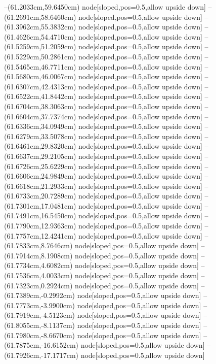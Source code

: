 --(61.2033cm,59.6450cm) node[sloped,pos=0.5,allow upside down]{\ArrowIn}
--(61.2691cm,58.6460cm) node[sloped,pos=0.5,allow upside down]{\ArrowIn}
--(61.3962cm,55.3832cm) node[sloped,pos=0.5,allow upside down]{\ArrowIn}
--(61.4626cm,54.4710cm) node[sloped,pos=0.5,allow upside down]{\arrowIn}
--(61.5259cm,51.2059cm) node[sloped,pos=0.5,allow upside down]{\ArrowIn}
--(61.5229cm,50.2861cm) node[sloped,pos=0.5,allow upside down]{\arrowIn}
--(61.5465cm,46.7711cm) node[sloped,pos=0.5,allow upside down]{\ArrowIn}
--(61.5680cm,46.0067cm) node[sloped,pos=0.5,allow upside down]{\arrowIn}
--(61.6307cm,42.4313cm) node[sloped,pos=0.5,allow upside down]{\ArrowIn}
--(61.6522cm,41.8442cm) node[sloped,pos=0.5,allow upside down]{\arrowIn}
--(61.6704cm,38.3063cm) node[sloped,pos=0.5,allow upside down]{\ArrowIn}
--(61.6604cm,37.7374cm) node[sloped,pos=0.5,allow upside down]{\arrowIn}
--(61.6336cm,34.0949cm) node[sloped,pos=0.5,allow upside down]{\ArrowIn}
--(61.6279cm,33.5078cm) node[sloped,pos=0.5,allow upside down]{\arrowIn}
--(61.6461cm,29.8320cm) node[sloped,pos=0.5,allow upside down]{\ArrowIn}
--(61.6637cm,29.2105cm) node[sloped,pos=0.5,allow upside down]{\arrowIn}
--(61.6726cm,25.6229cm) node[sloped,pos=0.5,allow upside down]{\ArrowIn}
--(61.6606cm,24.9849cm) node[sloped,pos=0.5,allow upside down]{\arrowIn}
--(61.6618cm,21.2933cm) node[sloped,pos=0.5,allow upside down]{\ArrowIn}
--(61.6733cm,20.7289cm) node[sloped,pos=0.5,allow upside down]{\arrowIn}
--(61.7301cm,17.0481cm) node[sloped,pos=0.5,allow upside down]{\ArrowIn}
--(61.7491cm,16.5450cm) node[sloped,pos=0.5,allow upside down]{\arrowIn}
--(61.7790cm,12.9363cm) node[sloped,pos=0.5,allow upside down]{\ArrowIn}
--(61.7757cm,12.4241cm) node[sloped,pos=0.5,allow upside down]{\arrowIn}
--(61.7833cm,8.7646cm) node[sloped,pos=0.5,allow upside down]{\ArrowIn}
--(61.7914cm,8.1908cm) node[sloped,pos=0.5,allow upside down]{\arrowIn}
--(61.7734cm,4.6082cm) node[sloped,pos=0.5,allow upside down]{\ArrowIn}
--(61.7536cm,4.0033cm) node[sloped,pos=0.5,allow upside down]{\arrowIn}
--(61.7323cm,0.2924cm) node[sloped,pos=0.5,allow upside down]{\ArrowIn}
--(61.7389cm,-0.2992cm) node[sloped,pos=0.5,allow upside down]{\arrowIn}
--(61.7773cm,-3.9900cm) node[sloped,pos=0.5,allow upside down]{\ArrowIn}
--(61.7919cm,-4.5123cm) node[sloped,pos=0.5,allow upside down]{\arrowIn}
--(61.8055cm,-8.1137cm) node[sloped,pos=0.5,allow upside down]{\ArrowIn}
--(61.7980cm,-8.6670cm) node[sloped,pos=0.5,allow upside down]{\arrowIn}
--(61.7875cm,-16.6152cm) node[sloped,pos=0.5,allow upside down]{\ArrowIn}
--(61.7926cm,-17.1717cm) node[sloped,pos=0.5,allow upside down]{\arrowIn}
